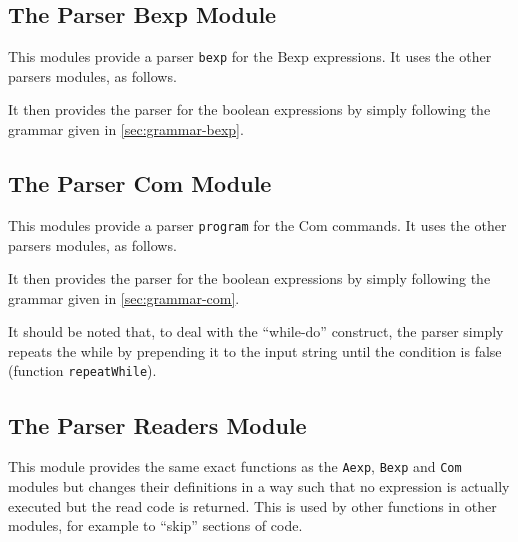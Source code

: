 \documentclass{esposito-documentation}
\begin{document}


\subsection{The Parser Bexp Module}


This modules provide a parser \lstinline|bexp| for the $\mathrm{Bexp}$
expressions. It uses the other parsers modules, as follows.



It then provides the parser for the boolean expressions by simply following the
grammar given in \autoref{sec:grammar-bexp}.



\subsection{The Parser Com Module}


This modules provide a parser \lstinline|program| for the $\mathrm{Com}$
commands. It uses the other parsers modules, as follows.



It then provides the parser for the boolean expressions by simply following the
grammar given in \autoref{sec:grammar-com}.



It should be noted that, to deal with the ``while-do'' construct, the parser
simply repeats the while by prepending it to the input string until the
condition is false (function \lstinline|repeatWhile|).

\subsection{The Parser Readers Module}


This module provides the same exact functions as the \texttt{Aexp},
\texttt{Bexp} and \texttt{Com} modules but changes their definitions in a way
such that no expression is actually executed but the read code is returned.
This is used by other functions in other modules, for example to ``skip''
sections of code.
\end{document}
